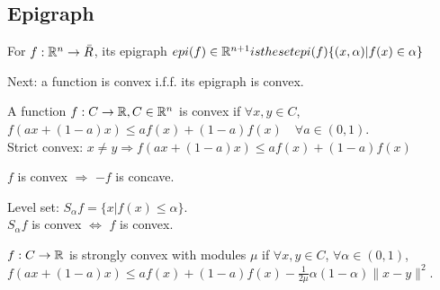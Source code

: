 \subsection{Epigraph} 
\begin{definition}[Epigraph]
For $f: \mathbb{R}^n \rightarrow \bar{R}$, its epigraph $epi(f) \in \mathbb{R}^{n+1} is the set epi(f) \{ (x,\alpha) | f(x) \in \alpha \}$
\end{definition}
Next: a function is convex i.f.f. its epigraph is convex.

\begin{definition}
A function $f : C \rightarrow \mathbb{R}, C \in \mathbb{R}^n$ is convex if $\forall x, y \in C$, $f(ax + (1-a)x) \le af(x) + (1-a)f(x) \quad \forall a \in (0,1)$.\\ 
Strict convex: $x \neq y \Rightarrow f(ax + (1-a)x) \le af(x) + (1-a)f(x) $
\end{definition}
\begin{remark}
$f$ is convex $\Rightarrow$ $-f$ is concave.
\end{remark}
Level set: $S_{\alpha}f = \{ x | f(x) \le \alpha \}$.\\ 
$S_{\alpha}f$ is convex $\Leftrightarrow$ $f$ is convex. \\
\begin{definition}
$f : C \rightarrow \mathbb{R}$ is strongly convex with modules $\mu$ if $\forall x, y \in C$, $\forall \alpha \in (0,1)$, $f(ax + (1-a)x) \le af(x) + (1-a)f(x) - \frac{1}{2\mu}\alpha(1- \alpha) \|x-y\|^2$.
\end{definition}

